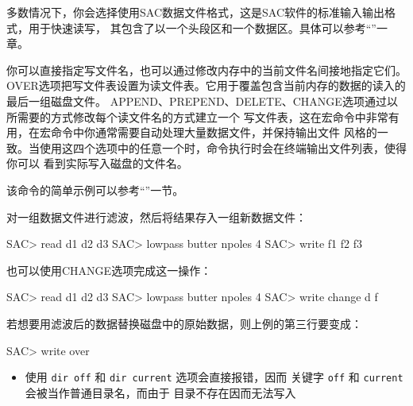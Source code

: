 多数情况下，你会选择使用SAC数据文件格式，这是SAC软件的标准输入输出格式，用于快速读写，
其包含了以一个头段区和一个数据区。具体可以参考``''一章。

你可以直接指定写文件名，也可以通过修改内存中的当前文件名间接地指定它们。
OVER选项把写文件表设置为读文件表。它用于覆盖包含当前内存的数据的读入的最后一组磁盘文件。
APPEND、PREPEND、DELETE、CHANGE选项通过以所需要的方式修改每个读文件名的方式建立一个
写文件表，这在宏命令中非常有用，在宏命令中你通常需要自动处理大量数据文件，并保持输出文件
风格的一致。当使用这四个选项中的任意一个时，命令执行时会在终端输出文件列表，使得你可以
看到实际写入磁盘的文件名。

该命令的简单示例可以参考``''一节。

对一组数据文件进行滤波，然后将结果存入一组新数据文件：
\begin{SACCode}
SAC> read d1 d2 d3
SAC> lowpass butter npoles 4
SAC> write f1 f2 f3
\end{SACCode}

也可以使用CHANGE选项完成这一操作：
\begin{SACCode}
SAC> read d1 d2 d3
SAC> lowpass butter npoles 4
SAC> write change d f
\end{SACCode}

若想要用滤波后的数据替换磁盘中的原始数据，则上例的第三行要变成：
\begin{SACCode}
SAC> write over
\end{SACCode}

\begin{itemize}
\item 使用 \texttt{dir off} 和 \texttt{dir current} 选项会直接报错，因而
    关键字 \texttt{off} 和 \texttt{current} 会被当作普通目录名，而由于
    目录不存在因而无法写入
\end{itemize}
